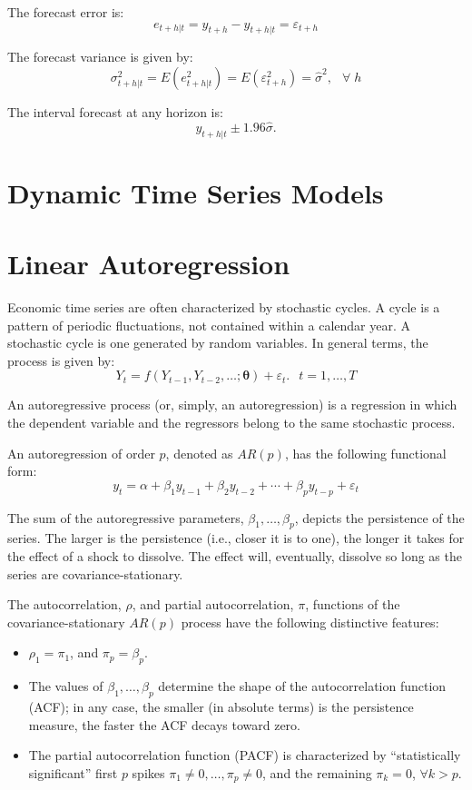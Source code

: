 \documentclass[
  oneside]{book}
\providecommand{\tightlist}{%
  \setlength{\itemsep}{0pt}\setlength{\parskip}{0pt}}
\begin{document}
The forecast error is: \[e_{t+h|t} = y_{t+h} - y_{t+h|t} = \varepsilon_{t+h}\]

The forecast variance is given by: \[\sigma_{t+h|t}^2 = E(e_{t+h|t}^2) =  E(\varepsilon_{t+h}^2) = \hat{\sigma}^2,\;~~\forall\;h\]

The interval forecast at any horizon is: \[y_{t+h|t} \pm 1.96 \hat{\sigma}.\]

\hypertarget{dynamic-time-series-models}{%
\chapter*{Dynamic Time Series Models}\label{dynamic-time-series-models}}

\hypertarget{linear-autoregression}{%
\chapter{Linear Autoregression}\label{linear-autoregression}}

Economic time series are often characterized by stochastic cycles. A cycle is a pattern of periodic fluctuations, not contained within a calendar year. A stochastic cycle is one generated by random variables. In general terms, the process is given by:
\[Y_t = f(Y_{t-1},Y_{t-2},\ldots;\mathbf{\theta})+\varepsilon_t.\;~~t=1,\ldots,T\]

An autoregressive process (or, simply, an autoregression) is a regression in which the dependent variable and the regressors belong to the same stochastic process.

An autoregression of order \(p\), denoted as \(AR(p)\), has the following functional form:
\[y_t = \alpha + \beta_1 y_{t-1}+\beta_2 y_{t-2}+ \cdots + \beta_p y_{t-p}+\varepsilon_t\]

The sum of the autoregressive parameters, \(\beta_1,\ldots,\beta_p\), depicts the persistence of the series. The larger is the persistence (i.e., closer it is to one), the longer it takes for the effect of a shock to dissolve. The effect will, eventually, dissolve so long as the series are covariance-stationary.

The autocorrelation, \(\rho\), and partial autocorrelation, \(\pi\), functions of the covariance-stationary \(AR(p)\) process have the following distinctive features:

\begin{itemize}
\tightlist
\item
  \(\rho_1 = \pi_1\), and \(\pi_p = \beta_p\).
\item
  The values of \(\beta_1,\ldots,\beta_p\) determine the shape of the autocorrelation function (ACF); in any case, the smaller (in absolute terms) is the persistence measure, the faster the ACF decays toward zero.
\item
  The partial autocorrelation function (PACF) is characterized by ``statistically significant'' first \(p\) spikes \(\pi_1 \neq 0,\ldots,\pi_p \neq 0\), and the remaining \(\pi_k = 0\), \(\forall k > p\).
\end{itemize}
\end{document}
